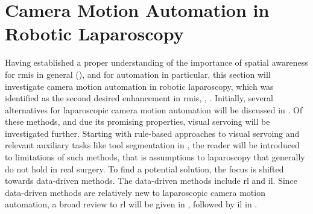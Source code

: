 \section{Camera Motion Automation in Robotic Laparoscopy}
\label{in:sec:camera_motion_automation}
Having established a proper understanding of the importance of spatial awareness for \gls{rmis} in general (), and for automation in particular, this section will investigate camera motion automation in robotic laparoscopy, which was identified as the second desired enhancement in \gls{rmis}, , . Initially, several alternatives for laparoscopic camera motion automation will be discussed in . Of these methods, and due its promising properties, visual servoing will be investigated further. Starting with rule-based approaches to visual servoing and relevant auxiliary tasks like tool segmentation in , the reader will be introduced to limitations of such methods, that is assumptions to laparoscopy that generally do not hold in real surgery. To find a potential solution, the focus is shifted towards data-driven methods. The data-driven methods include \gls{rl} and \gls{il}. Since data-driven methods are relatively new to laparoscopic camera motion automation, a broad review to \gls{rl} will be given in , followed by \gls{il} in .

